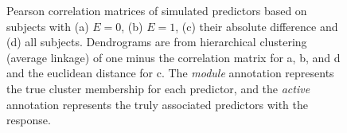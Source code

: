 \begin{figure}[H]
	\caption{Pearson correlation matrices of simulated predictors based on subjects with (a) $E=0$, (b) $E=1$, (c) their absolute difference and (d) all subjects. Dendrograms are from hierarchical clustering (average linkage) of one minus the correlation matrix for a, b, and d and the euclidean distance for c. The \textit{module} annotation represents the true cluster membership for each predictor, and the \textit{active} annotation represents the truly associated predictors with the response.}
	\label{fig:simcorr}
\end{figure}
